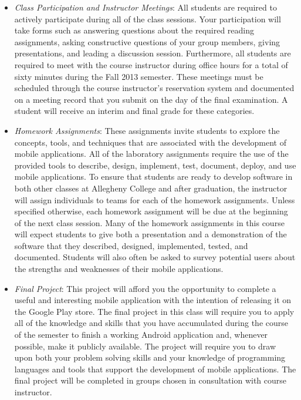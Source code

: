 \begin{itemize}

	\item {\em Class Participation and Instructor Meetings}: All students are required to actively participate during
		all of the class sessions. Your participation will take forms such as answering questions about the required
		reading assignments, asking constructive questions of your group members, giving presentations, and leading a
		discussion session. Furthermore, all students are required to meet with the course instructor during office
		hours for a total of sixty minutes during the Fall 2013 semester.  These meetings must be scheduled through the
		course instructor's reservation system and documented on a meeting record that you submit on the day of the final
		examination. A student will receive an interim and final grade for these categories.

	\item {\em Homework Assignments}: These assignments invite students to explore the concepts, tools,
		and techniques that are associated with the development of mobile applications.  All of the
		laboratory assignments require the use of the provided tools to describe, design, implement, test, document,
		deploy, and use mobile applications.  To ensure that students are ready to develop software in both other classes at
		Allegheny College and after graduation, the instructor will assign individuals to teams for each of the
		homework assignments.  Unless specified otherwise, each homework assignment will be due at the beginning of
		the next class session.  Many of the homework assignments in this course will expect students to
		give both a presentation and a demonstration of the software that they described, designed, implemented, tested,
		and documented. Students will also often be asked to survey potential users about the strengths and weaknesses
		of their mobile applications.
	
	\item {\em Final Project}: This project will afford you the opportunity to complete a useful and interesting mobile
		application with the intention of releasing it on the Google Play store.	The final project in this class will
		require you to apply all of the knowledge and skills that you have accumulated during the course of the semester
		to finish a working Android application and, whenever possible, make it publicly available.  The project will
		require you to draw upon both your problem solving skills and your knowledge of programming languages and tools
		that support the development of mobile applications. The final project will be completed in groups chosen in
		consultation with course instructor.
		
\end{itemize}

